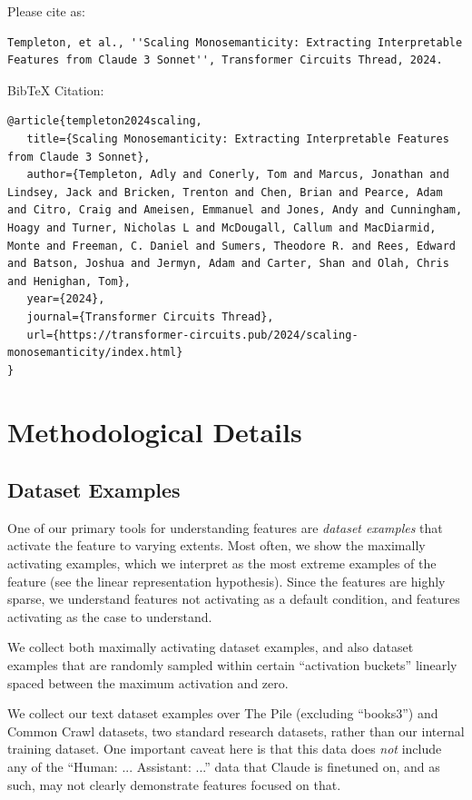\documentclass{article}
\let\oldsection\section
\renewcommand{\section}{\FloatBarrier\oldsection}
\let\oldsubsection\subsection
\renewcommand{\subsection}{\FloatBarrier\oldsubsection}
\begin{document}
Please cite as:

\begin{lstlisting}
Templeton, et al., ''Scaling Monosemanticity: Extracting Interpretable Features from Claude 3 Sonnet'', Transformer Circuits Thread, 2024.
\end{lstlisting}
BibTeX Citation:
\begin{lstlisting}
@article{templeton2024scaling,
   title={Scaling Monosemanticity: Extracting Interpretable Features from Claude 3 Sonnet},
   author={Templeton, Adly and Conerly, Tom and Marcus, Jonathan and Lindsey, Jack and Bricken, Trenton and Chen, Brian and Pearce, Adam and Citro, Craig and Ameisen, Emmanuel and Jones, Andy and Cunningham, Hoagy and Turner, Nicholas L and McDougall, Callum and MacDiarmid, Monte and Freeman, C. Daniel and Sumers, Theodore R. and Rees, Edward and Batson, Joshua and Jermyn, Adam and Carter, Shan and Olah, Chris and Henighan, Tom},
   year={2024},
   journal={Transformer Circuits Thread},
   url={https://transformer-circuits.pub/2024/scaling-monosemanticity/index.html}
}
\end{lstlisting}

\section{Methodological Details}\label{sec:appendix-methods}

\subsection{Dataset Examples}\label{sec:appendix-methods-dataset}

One of our primary tools for understanding features are \textit{dataset examples} that activate the feature to varying extents. Most often, we show the maximally activating examples, which we interpret as the most extreme examples of the feature (see the linear representation hypothesis). Since the features are highly sparse, we understand features not activating as a default condition, and features activating as the case to understand.

We collect both maximally activating dataset examples, and also dataset examples that are randomly sampled within certain “activation buckets” linearly spaced between the maximum activation and zero.

We collect our text dataset examples over The Pile (excluding “books3”) \cite{gao2020pile} and Common Crawl \cite{commoncrawl2024common} datasets, two standard research datasets, rather than our internal training dataset. One important caveat here is that this data does \textit{not} include any of the “Human: ... Assistant: ...” data that Claude is finetuned on, and as such, may not clearly demonstrate features focused on that.
\end{document}
